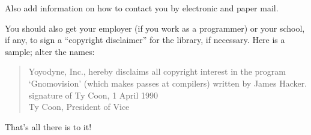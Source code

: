 \documentclass[12pt]{report}
\begin{document}
Also add information on how to contact you by electronic and paper mail.

You should also get your employer (if you work as a programmer) or your
school, if any, to sign a ``copyright disclaimer'' for the library, if
necessary.  Here is a sample; alter the names:

\begin{quote}
Yoyodyne, Inc., hereby disclaims all copyright interest in the program \\
`Gnomovision' (which makes passes at compilers) written by James Hacker. \\

signature of Ty Coon, 1 April 1990 \\
Ty Coon, President of Vice
\end{quote}

That's all there is to it!
\end{document}
